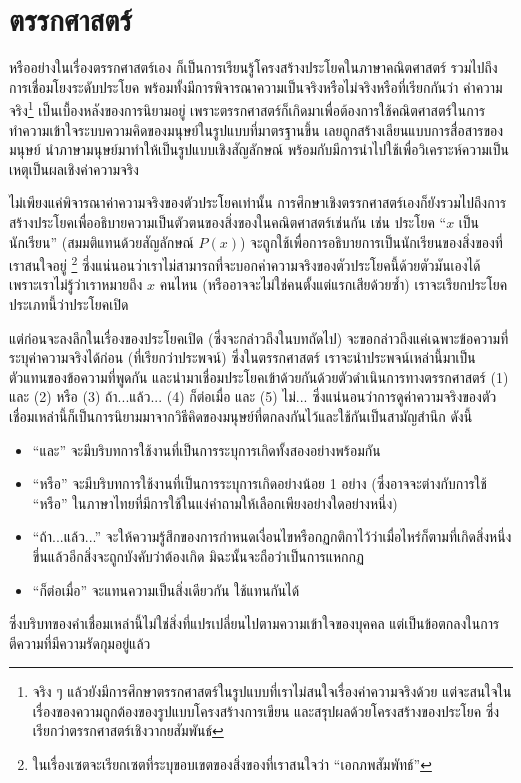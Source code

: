 \section{ตรรกศาสตร์}
หรืออย่างในเรื่องตรรกศาสตร์เอง ก็เป็นการเรียนรู้โครงสร้างประโยคในภาษาคณิตศาสตร์ รวมไปถึงการเชื่อมโยงระดับประโยค พร้อมทั้งมีการพิจารณาความเป็นจริงหรือไม่จริงหรือที่เรียกกันว่า ค่าความจริง\footnote{จริง ๆ แล้วยังมีการศึกษาตรรกศาสตร์ในรูปแบบที่เราไม่สนใจเรื่องค่าความจริงด้วย แต่จะสนใจในเรื่องของความถูกต้องของรูปแบบโครงสร้างการเขียน และสรุปผลด้วยโครงสร้างของประโยค ซึ่งเรียกว่าตรรกศาสตร์เชิงวากยสัมพันธ์} เป็นเบื้องหลังของการนิยามอยู่ เพราะตรรกศาสตร์ก็เกิดมาเพื่อต้องการใช้คณิตศาสตร์ในการทำความเข้าใจระบบความคิดของมนุษย์ในรูปแบบที่มาตรฐานขึ้น เลยถูกสร้างเลียนแบบการสื่อสารของมนุษย์ นำภาษามนุษย์มาทำให้เป็นรูปแบบเชิงสัญลักษณ์ พร้อมกับมีการนำไปใช้เพื่อวิเคราะห์ความเป็นเหตุเป็นผลเชิงค่าความจริง

ไม่เพียงแค่พิจารณาค่าความจริงของตัวประโยคเท่านั้น การศึกษาเชิงตรรกศาสตร์เองก็ยังรวมไปถึงการสร้างประโยคเพื่ออธิบายความเป็นตัวตนของสิ่งของในคณิตศาสตร์เช่นกัน เช่น ประโยค ``$x$ เป็นนักเรียน'' (สมมติแทนด้วยสัญลักษณ์ $P(x)$) จะถูกใช้เพื่อการอธิบายการเป็นนักเรียนของสิ่งของที่เราสนใจอยู่ \footnote{ในเรื่องเซตจะเรียกเซตที่ระบุขอบเขตของสิ่งของที่เราสนใจว่า ``เอกภพสัมพัทธ์''} ซึ่งแน่นอนว่าเราไม่สามารถที่จะบอกค่าความจริงของตัวประโยคนี้ด้วยตัวมันเองได้ เพราะเราไม่รู้ว่าเราหมายถึง $x$ คนไหน (หรืออาจจะไม่ใช่คนตั้งแต่แรกเสียด้วยซ้ำ) เราจะเรียกประโยคประเภทนี้ว่าประโยคเปิด

แต่ก่อนจะลงลึกในเรื่องของประโยคเปิด (ซึ่งจะกล่าวถึงในบทถัดไป) จะขอกล่าวถึงแค่เฉพาะข้อความที่ระบุค่าความจริงได้ก่อน (ที่เรียกว่าประพจน์) ซึ่งในตรรกศาสตร์ เราจะนำประพจน์เหล่านี้มาเป็นตัวแทนของข้อความที่พูดกัน และนำมาเชื่อมประโยคเข้าด้วยกันด้วยตัวดำเนินการทางตรรกศาสตร์ (1) และ (2) หรือ (3) ถ้า...แล้ว... (4) ก็ต่อเมื่อ และ (5) ไม่... ซึ่งแน่นอนว่าการดูค่าความจริงของตัวเชื่อมเหล่านี้ก็เป็นการนิยามมาจากวิธีคิดของมนุษย์ที่ตกลงกันไว้และใช้กันเป็นสามัญสำนึก ดังนี้
\begin{itemize}
	\item ``และ'' จะมีบริบทการใช้งานที่เป็นการระบุการเกิดทั้งสองอย่างพร้อมกัน
	\item ``หรือ'' จะมีบริบทการใช้งานที่เป็นการระบุการเกิดอย่างน้อย 1 อย่าง (ซึ่งอาจจะต่างกับการใช้ ``หรือ'' ในภาษาไทยที่มีการใช้ในแง่คำถามให้เลือกเพียงอย่างใดอย่างหนึ่ง)
	\item ``ถ้า...แล้ว...'' จะให้ความรู้สึกของการกำหนดเงื่อนไขหรือกฏกติกาไว้ว่าเมื่อไหร่ก็ตามที่เกิดสิ่งหนึ่งขึ่นแล้วอีกสิ่งจะถูกบังคับว่าต้องเกิด มิฉะนั้นจะถือว่าเป็นการแหกกฏ
	\item ``ก็ต่อเมื่อ'' จะแทนความเป็นสิ่งเดียวกัน ใช้แทนกันได้
\end{itemize}
ซึ่งบริบทของคำเชื่อมเหล่านี้ไม่ใช่สิ่งที่แปรเปลี่ยนไปตามความเข้าใจของบุคคล แต่เป็นข้อตกลงในการตีความที่มีความรัดกุมอยู่แล้ว

